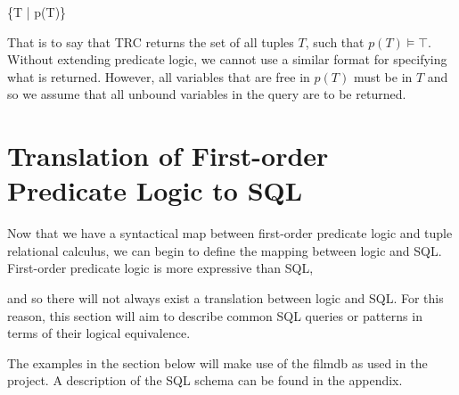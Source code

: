 \documentclass[a4paper, 11pt]{article}
\begin{document}
      \{T | p(T)\}

      That is to say that TRC returns the set of all tuples $T$, such that 
      $p(T) \models \top$. Without extending predicate logic, we cannot use 
      a similar format for specifying what is returned. However, all 
      variables that are free in $p(T)$ must be in $T$ and so we assume 
      that all unbound variables in the query are to be returned.

  \section{Translation of First-order Predicate Logic to SQL}

    Now that we have a syntactical map between first-order predicate logic and
    tuple relational calculus, we can begin to define the mapping between logic
    and SQL. First-order predicate logic is more expressive than SQL,

    and so there will not always exist a
    translation between logic and SQL. For this reason, this section will aim
    to describe common SQL queries or patterns in terms of their logical
    equivalence.

    The examples in the section below will make use of the filmdb as used in
    the project. A description of the SQL schema can be found in the appendix.
\end{document}
